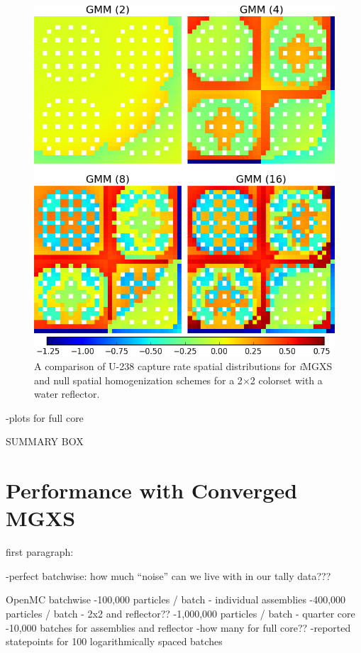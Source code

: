 \begin{figure}[h!]
\centering
\includegraphics[width=0.9\linewidth]{figures/results/compare/reflector/compare-capt}
\vspace{2mm}
\caption[U-238 capture rate comparison for a 2$\times$2 colorset with reflector]{A comparison of U-238 capture rate spatial distributions for \textit{i}\ac{MGXS} and null spatial homogenization schemes for a 2$\times$2 colorset with a water reflector.}
\label{fig:chap11-assm-refl-capt-rates}
\end{figure}

\clearpage

-plots for full core

SUMMARY BOX


\section{Performance with Converged MGXS}
\label{sec:chap11-improvements}

first paragraph:

-perfect batchwise: how much ``noise'' can we live with in our tally data???

OpenMC batchwise
-100,000 particles / batch - individual assemblies
-400,000 particles / batch - 2x2 and reflector??
-1,000,000 particles / batch - quarter core
-10,000 batches for assemblies and reflector
-how many for full core??
-reported statepoints for 100 logarithmically spaced batches

